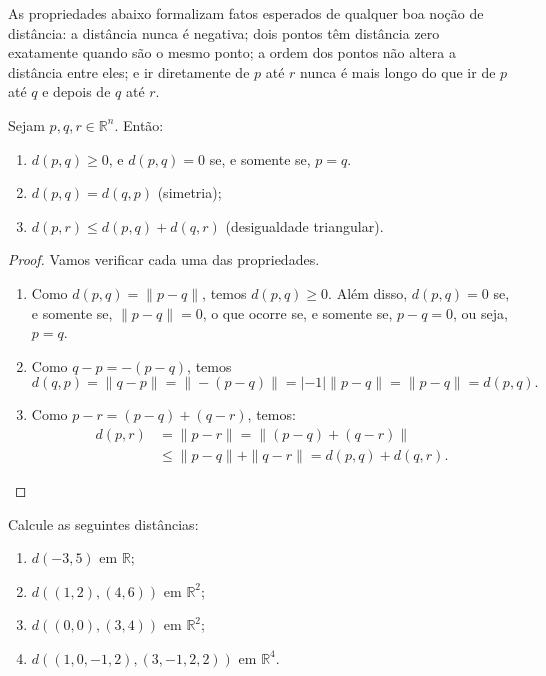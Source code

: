 As propriedades abaixo formalizam fatos esperados de qualquer boa noção de distância:
a distância nunca é negativa; dois pontos têm distância zero exatamente quando são o mesmo ponto;
a ordem dos pontos não altera a distância entre eles;
e ir diretamente de $p$ até $r$ nunca é mais longo do que ir de $p$ até $q$ e depois de $q$ até $r$.
\begin{proposition}\label{prop:distanciaRn}
    Sejam $p, q, r \in \mathbb R^n$. Então:
    \begin{enumerate}
        \item $d(p, q)\geq 0$, e $d(p, q) = 0$ se, e somente se, $p=q$.
        \item $d(p, q) = d(q, p)$ (simetria);
        \item $d(p, r) \leq d(p, q) + d(q, r)$ (desigualdade triangular).
    \end{enumerate}
\end{proposition}
\begin{proof}
    Vamos verificar cada uma das propriedades.
    \begin{enumerate}
        \item Como $d(p,q)=\|p-q\|$, temos $d(p,q)\geq 0$. Além disso, $d(p, q) = 0$ se, e somente se, $\|p-q\|=0$, o que ocorre se, e somente se, $p-q=0$, ou seja, $p=q$.
        \item Como $q-p=-(p-q)$, temos
        \[
            d(q,p)=\|q-p\|=\|-(p-q)\|=|-1|\|p-q\|=\|p-q\|=d(p,q).
        \]
        \item Como $p-r=(p-q)+(q-r)$, temos:
        \begin{align*}
            d(p, r) &= \|p-r\| = \|(p-q)+(q-r)\| \\
            &\leq \|p-q\| + \|q-r\| = d(p, q) + d(q, r).
        \end{align*}
    \end{enumerate}
\end{proof}

\begin{exercise}
    Calcule as seguintes distâncias:
    \begin{enumerate}[label=(\alph*)]
        \item $d(-3,5)$ em $\mathbb R$;
        \item $d((1,2),(4,6))$ em $\mathbb R^2$;
        \item $d((0,0),(3,4))$ em $\mathbb R^2$;
        \item $d((1,0,-1,2),(3,-1,2,2))$ em $\mathbb R^4$.
    \end{enumerate}
\end{exercise}


